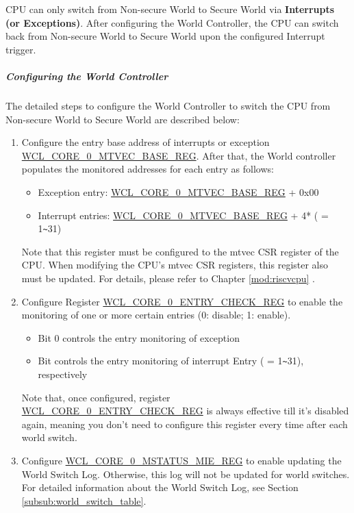 \documentclass[main\_\_EN.tex]{subfiles}
\begin{document}
CPU can only switch from Non-secure World to Secure World via \textbf{Interrupts (or Exceptions)}. After configuring the World Controller, the CPU can switch back from Non-secure World to Secure World upon the configured Interrupt trigger. 

\subparagraph{Configuring the World Controller} 

The detailed steps to configure the World Controller to switch the CPU from Non-secure World to Secure World are described below:
\begin{enumerate}
    \item Configure the entry base address of interrupts or exception \hyperref[regdesc:WCLCORE0MTVECBASEREG]{WCL\_CORE\_0\_MTVEC\_BASE\_REG}. After that, the World controller populates the monitored addresses for each entry as follows: 
    \begin{itemize}
        \item Exception entry: \hyperref[regdesc:WCLCORE0MTVECBASEREG]{WCL\_CORE\_0\_MTVEC\_BASE\_REG} + 0x00
        \item Interrupt entries: \hyperref[regdesc:WCLCORE0MTVECBASEREG]{WCL\_CORE\_0\_MTVEC\_BASE\_REG} + 4*  ( = 1\verb+~+31)
    \end{itemize}
    Note that this register must be configured to the mtvec CSR register of the CPU. When modifying the CPU's mtvec CSR registers, this register also must be updated. For details, please refer to Chapter \ref{mod:riscvcpu} \textit{}.
    \item Configure Register \hyperref[regdesc:WCLCORE0ENTRYCHECKREG]{WCL\_CORE\_0\_ENTRY\_CHECK\_REG} to enable the monitoring of one or more certain entries (0: disable; 1: enable). 
    \begin{itemize}
        \item Bit 0 controls the entry monitoring of exception 
        \item Bit  controls the entry monitoring of interrupt Entry  ( = 1\verb+~+31), respectively 
    \end{itemize}
    Note that, once configured, register \hyperref[regdesc:WCLCORE0ENTRYCHECKREG]{WCL\_CORE\_0\_ENTRY\_CHECK\_REG} is always effective till it's disabled again, meaning you don't need to configure this register every time after each world switch.
    \item Configure \hyperref[regdesc:WCLCORE0MSTATUSMIEREG]{WCL\_CORE\_0\_MSTATUS\_MIE\_REG} to enable updating the World Switch Log. Otherwise, this log will not be updated for world switches. For detailed information about the World Switch Log, see Section \ref{subsub:world_switch_table}.
\end{enumerate}
\end{document}
